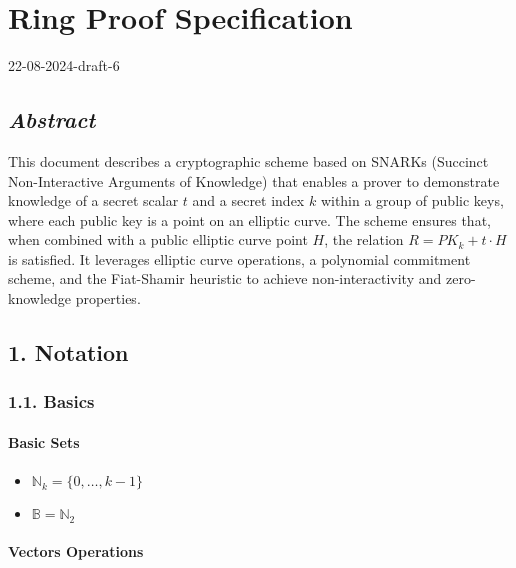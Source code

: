 \documentclass[
]{article}
\author{}
\date{}
\providecommand{\tightlist}{%
  \setlength{\itemsep}{0pt}\setlength{\parskip}{0pt}}
\begin{document}
\hypertarget{ring-proof-specification}{%
\section{Ring Proof Specification}\label{ring-proof-specification}}

22-08-2024-draft-6

\hypertarget{abstract}{%
\subsection{\texorpdfstring{\emph{Abstract}}{Abstract}}\label{abstract}}

This document describes a cryptographic scheme based on SNARKs (Succinct
Non-Interactive Arguments of Knowledge) that enables a prover to
demonstrate knowledge of a secret scalar \(t\) and a secret index \(k\)
within a group of public keys, where each public key is a point on an
elliptic curve. The scheme ensures that, when combined with a public
elliptic curve point \(H\), the relation \(R = PK_k + t·H\) is
satisfied. It leverages elliptic curve operations, a polynomial
commitment scheme, and the Fiat-Shamir heuristic to achieve
non-interactivity and zero-knowledge properties.

\hypertarget{notation}{%
\subsection{1. Notation}\label{notation}}

\hypertarget{basics}{%
\subsubsection{1.1. Basics}\label{basics}}

\hypertarget{basic-sets}{%
\paragraph{Basic Sets}\label{basic-sets}}

\begin{itemize}
\tightlist
\item
  \(\mathbb{N}_k = \{0, \dots, k-1\}\)
\item
  \(\mathbb{B} = \mathbb{N}_2\)
\end{itemize}

\hypertarget{vectors-operations}{%
\paragraph{Vectors Operations}\label{vectors-operations}}
\end{document}
